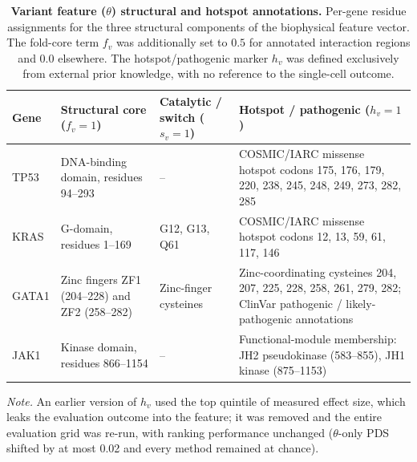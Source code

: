 \documentclass[11pt,letterpaper]{article}
\begin{document}
\begin{table}[H]
\centering
\caption{\textbf{Variant feature ($\theta$) structural and hotspot annotations.} Per-gene residue assignments for the three structural components of the biophysical feature vector. The fold-core term $f_v$ was additionally set to $0.5$ for annotated interaction regions and $0.0$ elsewhere. The hotspot/pathogenic marker $h_v$ was defined exclusively from external prior knowledge, with no reference to the single-cell outcome.}
\label{stab:features}
\small
\begin{tabular}{@{}p{1.5cm} p{4.3cm} p{2.8cm} p{6.7cm}@{}}
\toprule
Gene & Structural core ($f_v=1$) & Catalytic / switch ($s_v=1$) & Hotspot / pathogenic ($h_v=1$) \\
\midrule
TP53  & DNA-binding domain, residues 94--293 & -- & COSMIC/IARC missense hotspot codons 175, 176, 179, 220, 238, 245, 248, 249, 273, 282, 285 \\[2pt]
KRAS  & G-domain, residues 1--169 & G12, G13, Q61 & COSMIC/IARC missense hotspot codons 12, 13, 59, 61, 117, 146 \\[2pt]
GATA1 & Zinc fingers ZF1 (204--228) and ZF2 (258--282) & Zinc-finger cysteines & Zinc-coordinating cysteines 204, 207, 225, 228, 258, 261, 279, 282; ClinVar pathogenic / likely-pathogenic annotations \\[2pt]
JAK1  & Kinase domain, residues 866--1154 & -- & Functional-module membership: JH2 pseudokinase (583--855), JH1 kinase (875--1153) \\
\bottomrule
\end{tabular}
\end{table}

\noindent\textit{Note.} An earlier version of $h_v$ used the top quintile of measured effect size, which leaks the evaluation outcome into the feature; it was removed and the entire evaluation grid was re-run, with ranking performance unchanged ($\theta$-only PDS shifted by at most 0.02 and every method remained at chance).
\end{document}
